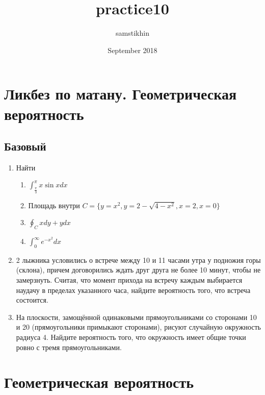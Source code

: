 \documentclass[a4paper, 14pt]{extarticle}
\title{practice10}
\author{samstikhin}
\date{September 2018}
\begin{document}
\section*{Ликбез по матану. Геометрическая вероятность}
\subsection*{Базовый}
\begin{enumerate}
\item Найти
\begin{enumerate}
    \item $\int_{\frac{\pi}{3}}^{\pi} x \sin{x} dx$
    \item Площадь внутри $C = \{y = x^2, y = 2 - \sqrt{4 - x^2},x = 2, x=0\}$
    \item $\oint_C xdy + ydx$
    \item $\int_{0}^{\infty}e^{-x^2}dx$
\end{enumerate}

\item 2 лыжника условились о встрече между
	10 и 11 часами утра у подножия горы (склона), причем договорились
	ждать друг друга не более 10 минут, чтобы не замерзнуть. Считая, что
	момент прихода на встречу каждым выбирается наудачу в пределах
	указанного часа, найдите вероятность того, что встреча состоится.
	\item На плоскости, замощённой одинаковыми прямоугольниками со сторонами 10 и 20 
	(прямоугольники примыкают сторонами), рисуют случайную окружность радиуса 4. 
	Найдите вероятность того, что окружность имеет общие точки ровно с тремя прямоугольниками.


\newpage

\end{enumerate}
\section*{Геометрическая вероятность}
\end{document}
